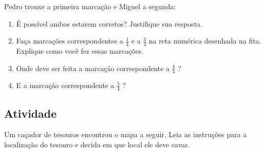 
Pedro trouxe a primeira marcação e Miguel a segunda:


\begin{center}

\end{center}

\begin{enumerate} [\quad a)] %
  \item     É possível ambos estarem corretos? Justifique sua resposta.
  \item     Faça marcações correspondentes a     $\frac{1}{4}$     e a     $\frac{3}{4}$  na reta numérica desenhada na fita. Explique como você fez essas marcações.
  \item     Onde deve ser feita a marcação correspondente a     $\frac{4}{4}$    ?
  \item     E a marcação correspondente a     $\frac{5}{4}$    ?
\end{enumerate} %

\subsection{Atividade}

Um caçador de tesouros encontrou o mapa a seguir. Leia as instruções para a localização do tesouro e decida em que local ele deve cavar.

